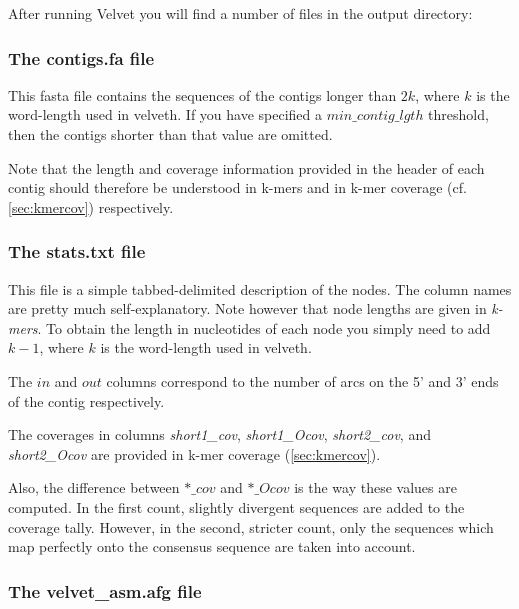 \documentclass{article}
\begin{document}
\label{sec:output}

After running Velvet you will find a number of files in the output directory:

\subsubsection{The contigs.fa file}

\label{sec:fasta}

This fasta file contains the sequences of the contigs longer than $2k$, where $k$ is the word-length used in velveth. If you have specified a $min\_contig\_lgth$ threshold, then the contigs shorter than that value are omitted.

Note that the length and coverage information provided in the header of each contig should therefore be understood in k-mers and in k-mer coverage (cf. \ref{sec:kmercov}) respectively.

\subsubsection{The stats.txt file}

\label{sec:stats}

This file is a simple tabbed-delimited description of the nodes. The column names are pretty much self-explanatory. Note however that node lengths are given in \emph{k-mers}. To obtain the length in nucleotides of each node you simply need to add $k-1$, where $k$ is the word-length used in velveth.

The $in$ and $out$ columns correspond to the number of arcs on the 5' and 3' ends of the contig respectively.

The coverages in columns \emph{short1\_cov}, \emph{short1\_Ocov}, \emph{short2\_cov}, and \emph{short2\_Ocov} are provided in k-mer coverage (\ref{sec:kmercov}).

Also, the difference between $*\_cov$ and $*\_Ocov$ is the way these values are computed. In the first count, slightly divergent sequences are added to the coverage tally. However, in the second, stricter count, only the sequences which map perfectly onto the consensus sequence are taken into account.

\subsubsection{The velvet\_asm.afg file}

\label{sec:amos}
\end{document}
